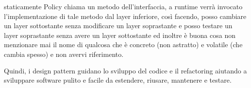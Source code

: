 staticamente Policy chiama un metodo dell'interfaccia, a runtime verrà invocato l'implementazione di tale metodo dal layer inferiore, così facendo, posso cambiare un
layer sottostante senza modificare un layer soprastante e posso testare un layer soprastante senza avere un layer sottostante ed inoltre è buona cosa non menzionare 
mai il nome di qualcosa che è concreto (non astratto) e volatile (che cambia spesso) e non avervi riferimento.

Quindi, i design pattern guidano lo sviluppo del codice e il refactoring aiutando a sviluppare software pulito e facile da estendere, riusare, mantenere e testare.